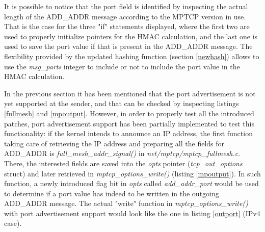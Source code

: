 It is possible to notice that the port field is identified by inspecting the actual length of the ADD\_ADDR message according to the MPTCP version in use. That is the case for the three "if" statements displayed, where the first two are used to properly initialize pointers for the HMAC calculation, and the last one is used to save the port value if that is present in the ADD\_ADDR message. The flexibility provided by the updated hashing function (section \ref{newhash}) allows to use the \textit{msg\_parts} integer to include or not to include the port value in the HMAC calculation. 


In the previous section it has been mentioned that the port advertisement is not yet supported at the sender, and that can be checked by inspecting listings \ref{fullmesh} and \ref{mpoutput}. 
However, in order to properly test all the introduced patches, port advertisement support has been partially implemented to test this functionality: if the kernel intends to announce an IP address, the first function taking care of retrieving the IP address and preparing all the fields for ADD\_ADDR is \textit{full\_mesh\_addr\_signal()} in \textit{net/mptcp/mptcp\_fullmesh.c}. There, the interested fields are saved into the \textit{opts} pointer (\textit{tcp\_out\_options} struct) and later retrieved in \textit{mptcp\_options\_write()} (listing \ref{mpoutput}). In such function, a newly introduced flag bit in \textit{opts} called \textit{add\_addr\_port} would be used to determine if a port value has indeed to be written in the outgoing ADD\_ADDR message. The actual "write" function in \textit{mptcp\_options\_write()} with port advertisement support would look like the one in listing \ref{outport} (IPv4 case).


